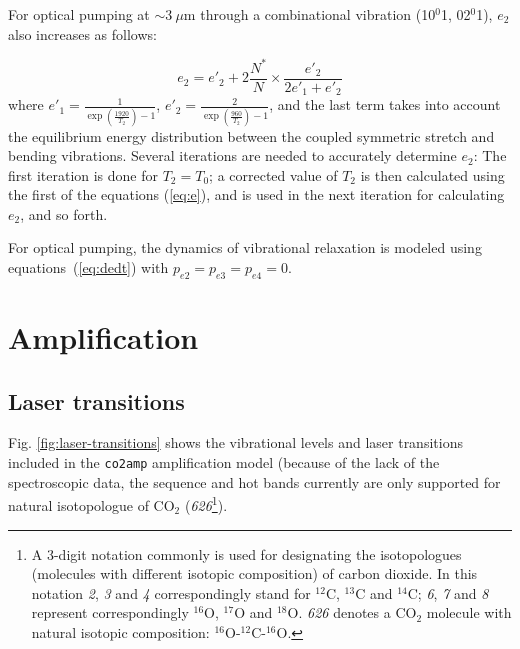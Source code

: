 \documentclass{report}
\begin{document}
For optical pumping at {$\sim 3~\mu$m} through a combinational vibration {(10$^0$1, 02$^0$1)}, $e_2$ also increases as follows:

\begin{equation}\label{eq:OpticalPumping_e2}
e_2 = e'_2 + 2\frac{N^*}{N} \times \frac{e'_2}{2e'_1+e'_2}
\end{equation}
where $e'_1 = \frac{1}{\exp\left(\frac{1920}{T_2}\right)-1}$, $e'_2 = \frac{2}{\exp\left(\frac{960}{T_2}\right)-1}$, and the last term takes into account the equilibrium energy distribution between the coupled symmetric stretch and bending vibrations. Several iterations are needed to accurately determine $e_2$: The first iteration is done for $T_2=T_0$; a corrected value of $T_2$ is then calculated using the first of the equations (\ref{eq:e}), and is used in the next iteration for calculating $e_2$, and so forth.

For optical pumping, the dynamics of vibrational relaxation is modeled using equations~(\ref{eq:dedt}) with $p_{e2}=p_{e3}=p_{e4}=0$.



\section{Amplification}

\subsection{Laser transitions}
Fig. \ref{fig:laser-transitions} shows the vibrational levels and laser transitions included in the \texttt{co2amp} amplification model (because of the lack of the spectroscopic data, the sequence and hot bands currently are only supported for natural isotopologue of {CO$_2$} (\textit{626}\footnote{A 3-digit notation commonly is used for designating the isotopologues (molecules with different isotopic composition) of carbon dioxide. In this notation \textit{2}, \textit{3} and \textit{4} correspondingly stand for {$^{12}$C}, {$^{13}$C} and {$^{14}$C}; \textit{6}, \textit{7} and \textit{8} represent  correspondingly {$^{16}$O}, {$^{17}$O} and {$^{18}$O}. \textit{626} denotes a {CO$_2$} molecule with natural isotopic composition: {{$^{16}$O}-{$^{12}$C}-{$^{16}$O}}.}).
\end{document}
